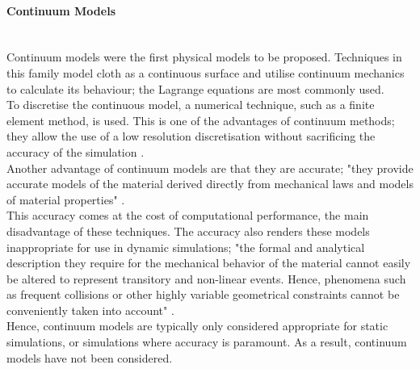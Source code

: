\paragraph{Continuum Models}\leavevmode\\
Continuum models were the first physical models to be proposed. Techniques in this family model cloth as a continuous surface and utilise continuum mechanics to calculate its behaviour; the Lagrange equations are most commonly used.
\\To discretise the continuous model, a numerical technique, such as a finite element method, is used. This is one of the advantages of continuum methods; they allow the use of a low resolution discretisation without sacrificing the accuracy of the simulation \parencite[4-5]{Wacker2005a}.
\\Another advantage of continuum models are that they are accurate; "they provide accurate models of the material derived directly from mechanical laws and models of material properties" \parencite[200]{Magnenat-Thalmann2006}.
\\This accuracy comes at the cost of computational performance, the main disadvantage of these techniques. The accuracy also renders these models inappropriate for use in dynamic simulations; "the formal and analytical description they require for the mechanical behavior of the material cannot easily be altered to represent transitory and non-linear events. Hence, phenomena such as frequent collisions or other highly variable geometrical constraints cannot be conveniently taken into account" \parencite[200]{Magnenat-Thalmann2006}. 
\\Hence, continuum models are typically only considered appropriate for static simulations, or simulations where accuracy is paramount. As a result, continuum models have not been considered.


